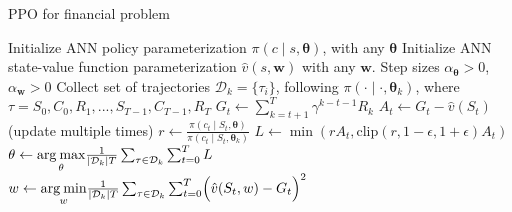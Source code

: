\documentclass[balance,upint,subscriptcorrection,varvw,mathalfa=cal=boondoxo,pdf-a,nofoot]{asmeconf}
\begin{document}
\begin{algorithm}
    \caption{PPO for financial problem~\cite{SpinningUp2018}}
    \label{algorithm:ppo}
    \begin{algorithmic}[1]
        \State Initialize ANN policy parameterization
        \(\pi\left(c\middle|s, \bm{\theta}\right)\), with any \(\bm{\theta}\)
        \State Initialize ANN state-value function parameterization
        \(\hat{v}(s,\bm{w})\) with any \(\bm{w}\).
        \State Step sizes \(\alpha_{\bm{\theta}}>0\), \(\alpha_{\bm{w}}>0\)
        \State Collect set of trajectories \(\mathcal{D}_k=\{\tau_i\}\),
        following \(\pi\left(\cdot\middle|\cdot, \bm{\theta}_k\right)\), where
        \(\tau = S_0, C_0, R_1, ..., S_{T-1}, C_{T-1}, R_T\)
        \State \(G_t \gets \sum_{k=t+1}^{T} \gamma^{k-t-1}R_k\)
        \State \(A_t \gets G_t - \hat{v}(S_t)\)
        \EndFor
        \Loop \hspace{0.3mm} (update multiple times)\vspace{1mm}
        \State \(r \gets \frac{\pi\left(c_t\middle|S_t, \bm{\theta}\right)}
        {\pi\left(c_t\middle|S_t, \bm{\theta}_k\right)}\)\vspace{1.2mm}
        \State \(L \gets \min{\left(
                rA_t,
                \text{clip}\left(r, 1-\epsilon, 1+\epsilon\right)A_t 
        \right)}\)\vspace{1mm}
        \State \(\bm{\theta} \gets \underset{\bm{\theta}}{\text{arg\:max}}
        \frac{1}{|\mathcal{D}_k|T}
        \sum_{\tau\in\mathcal{D}_k}^{} \sum_{t=0}^{T} L\)
        \State \(\bm{w} \gets \underset{\bm{w}}{\text{arg\:min}}
        \frac{1}{|\mathcal{D}_k|T}\sum_{\tau\in\mathcal{D}_k}^{} \sum_{t=0}^{T}
        \Bigl(\hat{v}(S_t, \bm{w})-G_t\Bigr)^2\)
        \EndLoop
        \EndFor
    \end{algorithmic}
\end{algorithm}
\end{document}
